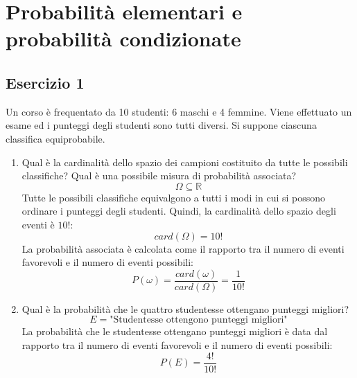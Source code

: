 \documentclass[a4paper]{article}
\theoremstyle{break}
\theoremstyle{break}
\theoremstyle{break}
\theoremstyle{break}
\begin{document}


\tableofcontents
\pagebreak

\section{Probabilità elementari e probabilità condizionate}
\subsection{Esercizio 1}
Un corso è frequentato da 10 studenti: 6 maschi e 4 femmine. Viene effettuato un
esame ed i punteggi degli studenti sono tutti diversi. Si suppone ciascuna classifica
equiprobabile.
\begin{enumerate}
	\item Qual è la cardinalità dello spazio dei campioni costituito da tutte le
	      possibili classifiche? Qual è una possibile misura di probabilità associata?
	      \[
		      \Omega \subseteq \mathbb{R}
	      \]
	      Tutte le possibili classifiche equivalgono a tutti i modi in cui si possono
	      ordinare i punteggi degli studenti. Quindi, la cardinalità dello spazio degli
	      eventi è $10!$:
	      \[
		      card(\Omega) = 10!
	      \]
	      La probabilità associata è calcolata come il rapporto tra il numero di eventi
	      favorevoli e il numero di eventi possibili:
	      \[
		      P(\omega) = \frac{card(\omega)}{card(\Omega)} = \frac{1}{10!}
	      \]
	\item Qual è la probabilità che le quattro studentesse ottengano punteggi migliori?
	      \[
		      E = \text{"Studentesse ottengono punteggi migliori"}
	      \]
	      La probabilità che le studentesse ottengano punteggi migliori è data dal rapporto
	      tra il numero di eventi favorevoli e il numero di eventi possibili:
	      \[
		      P(E) = \frac{4!}{10!}
	      \]
\end{enumerate}
\end{document}
